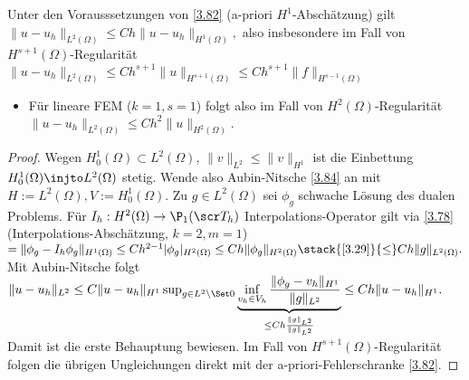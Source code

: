 \begin{st} \label{3.85}
	Unter den Vorausssetzungen von \ref{3.82} (a-priori $H^1$-Abschätzung) gilt
	\begin{math}
		\|u - u_h\|_{L^2(\Omega)}
		\le C h \|u - u_h\|_{H^1(\Omega)},
	\end{math}
	also insbesondere im Fall von $H^{s+1}(\Omega)$-Regularität
	\begin{math}
		\|u - u_h\|_{L^2(\Omega)} \le C h^{s+1} \|u\|_{H^{s+1}(\Omega)}
		\le C h^{s+1} \|f\|_{H^{s-1}(\Omega)}
	\end{math}
	\begin{note}
		\begin{itemize}
			\item
				Für lineare FEM ($k = 1, s = 1$) folgt also im Fall von $H^2(\Omega)$-Regularität
				\begin{math}
					\|u - u_h\|_{L^2(\Omega)}
					\le C h^2 \|u\|_{H^2(\Omega)}.
				\end{math}
		\end{itemize}
	\end{note}
	\begin{proof}
		Wegen $H_0^1(\Omega) \subset L^2(\Omega)$, $\|v\|_{L^2} \le \|v\|_{H^1}$ ist die Einbettung $H_0^1(\Omega) \injto L^2(\Omega)$ stetig.
		Wende also Aubin-Nitsche \ref{3.84} an mit $H := L^2(\Omega), V := H_0^1(\Omega)$.
		Zu $g \in L^2(\Omega)$ sei $\phi_g$ schwache Lösung des dualen Problems.
		Für $I_h: H^2(\Omega) \to \P_1(\scr T_h)$ Interpolations-Operator gilt via \ref{3.78} (Interpolations-Abschätzung, $k = 2, m = 1$)
		\begin{math}
			= \|\phi_g - I_h \phi_g\|_{H^1(\Omega)}
			\le C h^{2 - 1} |\phi_g |_{H^2(\Omega)}
			\le C h \|\phi_g\|_{H^2(\Omega)}
			\stack{\ref{3.29}}{\le} C h \|g\|_{L^2(\Omega)}.
		\end{math}
		Mit Aubin-Nitsche folgt
		\begin{math}
			\|u - u_h\|_{L^2}
			\le C \|u - u_h\|_{H^1} \sup_{g \in L^2 \setminus \Set 0} \underbrace{\inf_{v_h \in V_h} \frac{\|\phi_g - v_h\|_{H^1}}{\|g\|_{L^2}}}_{\le C h \frac{\|g\|_{L^2}}{\|g\|_{L^2}}}
			\le C h \|u - u_h\|_{H^1}.
		\end{math}
		Damit ist die erste Behauptung bewiesen.
		Im Fall von $H^{s+1}(\Omega)$-Regularität folgen die übrigen Ungleichungen direkt mit der a-priori-Fehlerschranke \ref{3.82}.
	\end{proof}
	\begin{note}
		\begin{itemize}

\end{itemize}
\end{note}
\end{st}
